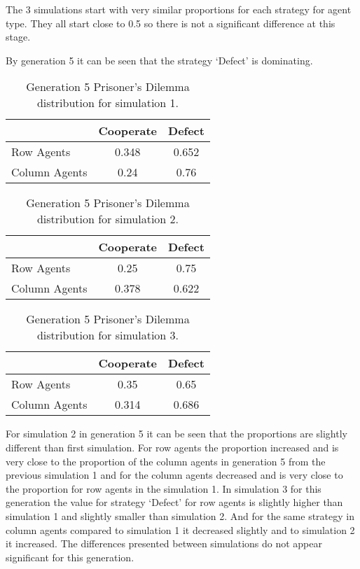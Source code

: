 \documentclass{book}
\begin{document}
 The 3 simulations start with very similar proportions for each strategy for agent type. They all start close to 0.5 so there is not a significant difference at this stage.

By generation 5 it can be seen that the strategy `Defect' is dominating.

\begin{table}[H]
\begin{center}
\begin{tabular}{|l|c|c|}
\hline
& Cooperate & Defect \\ 
\hline
Row Agents & 0.348 & 0.652\\
\hline
Column Agents & 0.24 & 0.76\\
\hline
\end{tabular}
\end{center}
\caption{ Generation 5 Prisoner’s Dilemma distribution for simulation 1.}
\label{tab:pds1g5}
\end{table}

\begin{table}[H]
\begin{center}
\begin{tabular}{|l|c|c|}
\hline
& Cooperate & Defect \\ 
\hline
Row Agents & 0.25 & 0.75\\
\hline
Column Agents & 0.378 & 0.622\\
\hline
\end{tabular}
\end{center}
\caption{Generation 5 Prisoner’s Dilemma distribution for simulation 2.}
\label{tab:pds2g5}
\end{table}

\begin{table}[H]
\begin{center}
\begin{tabular}{|l|c|c|}
\hline
& Cooperate & Defect \\ 
\hline
Row Agents & 0.35 & 0.65\\
\hline
Column Agents & 0.314 & 0.686\\
\hline
\end{tabular}
\end{center}
\caption{Generation 5 Prisoner’s Dilemma distribution for simulation 3.}
\label{tab:pds3g5}
\end{table}
For simulation 2 in generation 5 it can be seen that the proportions are slightly different than first simulation. For row agents the proportion increased and is very close to the proportion of the column agents in generation 5 from the previous simulation 1 and for the column agents decreased and is very close to the proportion for row agents in the simulation 1.
In simulation 3 for this generation the value for strategy `Defect' for row agents is slightly higher than simulation 1 and slightly smaller than simulation 2. And for the same strategy in column agents compared to simulation 1 it decreased slightly and to simulation 2 it increased. The differences presented between simulations do not appear significant for this generation.
\end{document}
